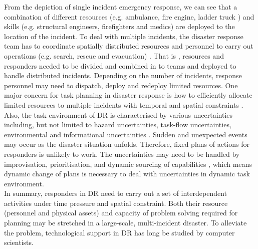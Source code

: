 From the depiction of single incident emergency response, we can see that a combination of different resources (e.g. ambulance, fire engine, ladder truck ) and skills (e.g. structural engineers, firefighters and medics) are deployed to the location of the incident. To deal with multiple incidents, the disaster response team has to coordinate spatially distributed resources and personnel to carry out operations (e.g. search, rescue and evacuation) \cite{Chen2005}. That is , resources and responders needed to be divided and combined in to teams and deployed to handle distributed incidents. Depending on the number of incidents, response personnel may need to dispatch, deploy and redeploy limited resources. One major concern for task planning in disaster response is how to efficiently allocate limited resources to multiple incidents with temporal and spatial constraints \cite{Bradshaw2011}.\\

Also, the task environment of \ac{DR} is characterised by various uncertainties including, but not limited to hazard uncertainties, task-flow uncertainties, environmental and informational uncertainties \cite{Chen2008}. Sudden and unexpected events may occur as the disaster situation unfolds. Therefore, fixed plans of actions for responders is unlikely to work. The uncertainties may need to be handled by improvisation, prioritisation, and dynamic sourcing of capabilities \cite{Faraj2006}, which means dynamic change of plans is necessary to deal with uncertainties in dynamic task environment.\\   

In summary, responders in \ac{DR} need to carry out a set of interdependent activities under time pressure and spatial constraint. Both their resource (personnel and physical assets) and capacity of problem solving required for planning may be stretched in a large-scale, multi-incident disaster. To alleviate the problem, technological support in \ac{DR} has long be studied by computer scientists.\\ 




